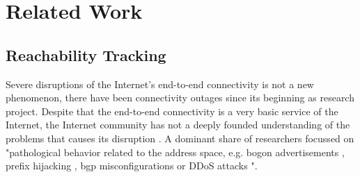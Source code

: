 \section{Related Work 
\label{sec:related_work}} 
\subsection{Reachability
Tracking}

Severe disruptions of the Internet's end-to-end connectivity is not a new
phenomenon, there have been connectivity outages since its beginning as
research project. Despite that the end-to-end connectivity is a very basic
service of the Internet, the Internet community has not a deeply founded
understanding of the problems that causes its disruption \citep{Bush:Optometry}.
A dominant share of researchers focussed on "pathological behavior related to
the address space, e.g. bogon advertisements \citep{Feamster:2005}, prefix
hijacking \citep{Zhang:2010}, \gls{bgp} misconfigurations \citep{Mahajan:2002} 
or \gls{DDoS} attacks \citep{Chen:2001}"\citep{Bush:Optometry}.

